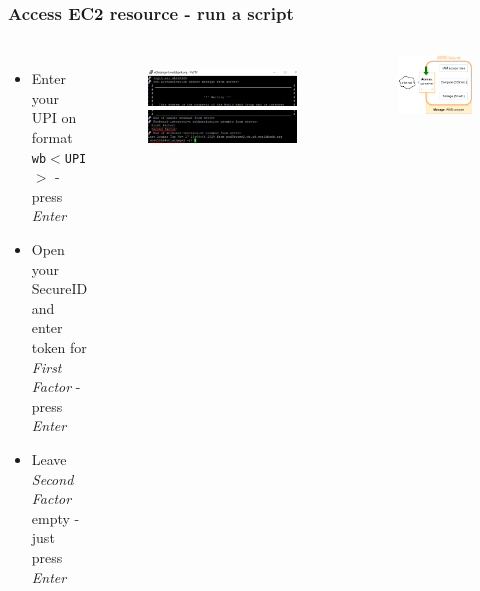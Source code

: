 \documentclass[aspectratio=169]{beamer} %
\begin{document}
\begin{frame}
	\frametitle{Access EC2 resource - run a script}
	\begin{columns}[c]
		\begin{itemize}
			\item Enter your UPI on format \texttt{wb$<$UPI$>$} - press \textit{Enter}
			\item Open your SecureID and enter token for \textit{First Factor} - press \textit{Enter}
			\item Leave \textit{Second Factor} empty - just press \textit{Enter}
		\end{itemize}

		\begin{figure}
			\centering
			\includegraphics[width=\textwidth]{./img/access-2a.png}
			\includegraphics[width=\textwidth]{./img/access-2b.png}
		\end{figure}

		\begin{figure}
			\centering
			\includegraphics[width=\textwidth]{./img/wb-aws-gw.png}
		\end{figure}

	\end{columns}
\end{frame}
\end{document}

